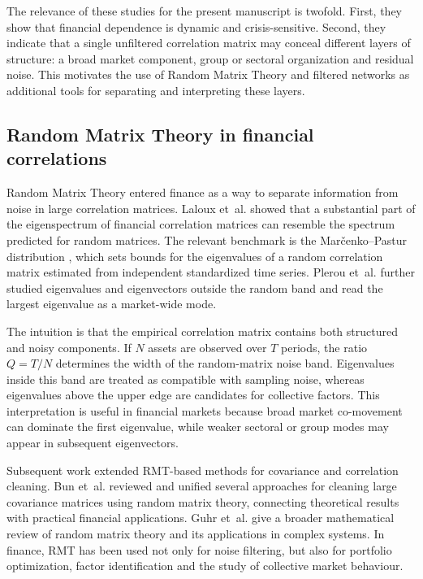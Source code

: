 The relevance of these studies for the present manuscript is twofold. First, they show that financial dependence is dynamic and crisis-sensitive. Second, they indicate that a single unfiltered correlation matrix may conceal different layers of structure: a broad market component, group or sectoral organization and residual noise. This motivates the use of Random Matrix Theory and filtered networks as additional tools for separating and interpreting these layers.

\subsection{Random Matrix Theory in financial correlations}

Random Matrix Theory entered finance as a way to separate information from noise in large correlation matrices. Laloux et~al. \cite{laloux_1999_noise,laloux_2000_random} showed that a substantial part of the eigenspectrum of financial correlation matrices can resemble the spectrum predicted for random matrices. The relevant benchmark is the Mar\v{c}enko--Pastur distribution \cite{marcenko_1967_distribution}, which sets bounds for the eigenvalues of a random correlation matrix estimated from independent standardized time series. Plerou et~al. \cite{plerou_2002_random} further studied eigenvalues and eigenvectors outside the random band and read the largest eigenvalue as a market-wide mode.

The intuition is that the empirical correlation matrix contains both structured and noisy components. If $N$ assets are observed over $T$ periods, the ratio $Q=T/N$ determines the width of the random-matrix noise band. Eigenvalues inside this band are treated as compatible with sampling noise, whereas eigenvalues above the upper edge are candidates for collective factors. This interpretation is useful in financial markets because broad market co-movement can dominate the first eigenvalue, while weaker sectoral or group modes may appear in subsequent eigenvectors.

Subsequent work extended RMT-based methods for covariance and correlation cleaning. Bun et~al. \cite{bun_2017_cleaning} reviewed and unified several approaches for cleaning large covariance matrices using random matrix theory, connecting theoretical results with practical financial applications. Guhr et~al. \cite{guhr_muller_1998} give a broader mathematical review of random matrix theory and its applications in complex systems. In finance, RMT has been used not only for noise filtering, but also for portfolio optimization, factor identification and the study of collective market behaviour.

